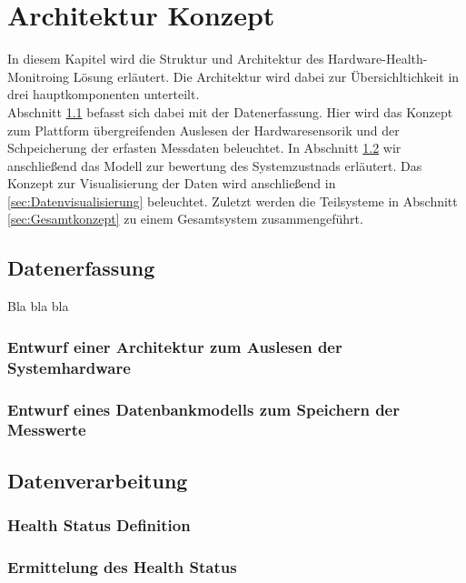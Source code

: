 \chapter{Architektur Konzept}
In diesem Kapitel wird die Struktur und Architektur des Hardware-Health-Monitroing Lösung erläutert. Die Architektur wird dabei zur Übersichltichkeit in drei hauptkomponenten unterteilt.\\
Abschnitt \ref{sec:Datenerfassung} befasst sich dabei mit der Datenerfassung. Hier wird das Konzept zum Plattform übergreifenden Auslesen der Hardwaresensorik und der Schpeicherung der erfasten Messdaten beleuchtet. In Abschnitt \ref{sec:Datenverarbeitung} wir anschließend das Modell zur bewertung des Systemzustnads erläutert. Das Konzept zur Visualisierung der Daten wird anschließend in \ref{sec:Datenvisualisierung} beleuchtet. Zuletzt werden die Teilsysteme in Abschnitt \ref{sec:Gesamtkonzept} zu einem Gesamtsystem zusammengeführt. 

\section{Datenerfassung}\label{sec:Datenerfassung}
Bla bla bla
\subsection{Entwurf einer Architektur zum Auslesen der Systemhardware}
\subsection{Entwurf eines Datenbankmodells zum Speichern der Messwerte}

\section{Datenverarbeitung}\label{sec:Datenverarbeitung}
\subsection{Health Status Definition}
\subsection{Ermittelung des Health Status}
